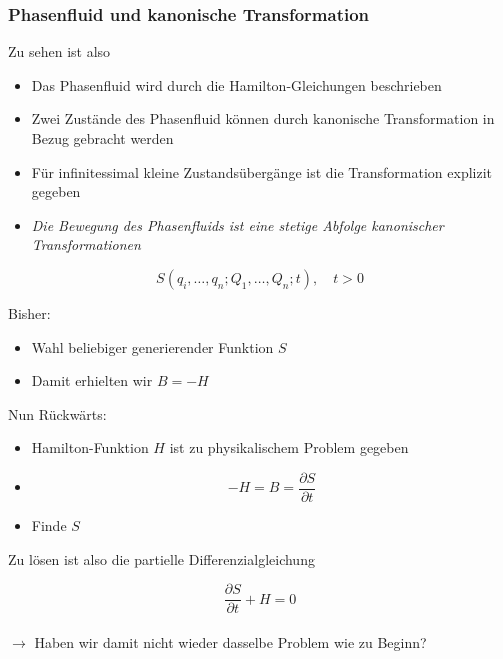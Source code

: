 \begin{frame}
    \frametitle{Phasenfluid und kanonische Transformation}
    Zu sehen ist also
    \begin{itemize}
        \item Das Phasenfluid wird durch die Hamilton-Gleichungen beschrieben
        \item Zwei Zustände des Phasenfluid können durch kanonische Transformation in Bezug gebracht werden
        \item Für infinitessimal kleine Zustandsübergänge ist die Transformation explizit gegeben
        \item \emph{Die Bewegung des Phasenfluids ist eine stetige Abfolge kanonischer Transformationen}
    \end{itemize}
    
    \begin{displaymath}
        S(q_i,\ldots,q_n;Q_1,\ldots,Q_n;t), \quad t>0
    \end{displaymath}
    
\end{frame}

\begin{frame}
    Bisher:
    \begin{itemize}
        \item Wahl beliebiger generierender Funktion $S$
        \item Damit erhielten wir $B = -H$
    \end{itemize}
    \vspace{1cm}
    Nun Rückwärts:
    \begin{itemize}
        \item Hamilton-Funktion $H$ ist zu physikalischem Problem gegeben
        \item \begin{displaymath} -H = B = \frac{\partial S}{\partial t} \end{displaymath}
        \item Finde $S$
    \end{itemize}
    
\end{frame}


\begin{frame}
    Zu lösen ist also die partielle Differenzialgleichung

    \begin{displaymath}
        \frac{\partial S}{\partial t} + H = 0
    \end{displaymath} \\
        \vspace{1cm}
    $\longrightarrow$ Haben wir damit nicht wieder dasselbe Problem wie zu Beginn? 
\end{frame}

